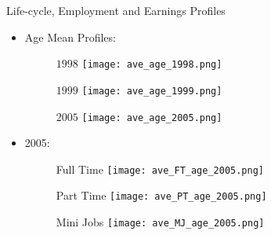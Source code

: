\documentclass{beamer}
\begin{document}
\begin{frame}{Life-cycle, Employment and Earnings Profiles}
\begin{itemize}
\item Age Mean Profiles:
\begin{figure}
\begin{minipage}[b]{0.3\textwidth}{$1998$}
\centering
\texttt{[image: ave\_age\_1998.png]}
\end{minipage}
\begin{minipage}[b]{0.3\textwidth}{$1999$}
\centering
\texttt{[image: ave\_age\_1999.png]}
\end{minipage}
\begin{minipage}[b]{0.3\textwidth}{$2005$}
\centering
\texttt{[image: ave\_age\_2005.png]}
\end{minipage}
\end{figure}
\item 2005:
\begin{figure}
\begin{minipage}[b]{0.3\textwidth}{Full Time}
\centering
\texttt{[image: ave\_FT\_age\_2005.png]}
\end{minipage}
\begin{minipage}[b]{0.3\textwidth}{Part Time}
\centering
\texttt{[image: ave\_PT\_age\_2005.png]}
\end{minipage}
\begin{minipage}[b]{0.3\textwidth}{Mini Jobs}
\centering
\texttt{[image: ave\_MJ\_age\_2005.png]}
\end{minipage}
\end{figure}
\end{itemize}
\end{frame}
\end{document}

